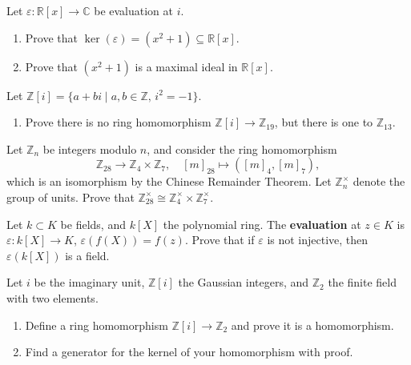 \documentclass[11pt,twoside,openany]{memoir}
\begin{document}
    \begin{exercise}
    Let $\varepsilon:\mathbb{R}[x]\to \mathbb{C}$ be evaluation at $i$.
    \begin{enumerate}[label=(\alph*)]
        \item Prove that $\ker(\varepsilon)=(x^2+1)\subseteq \mathbb{R}[x]$.
        \item Prove that $(x^2+1)$ is a maximal ideal in $\mathbb{R}[x]$.
    \end{enumerate}
    \end{exercise}
    
    \begin{exercise}
    Let $\mathbb{Z}[i]=\{a+bi \mid a,b\in \mathbb{Z},\, i^2=-1\}$.
    \begin{enumerate}[label=(\alph*)]
        \item Prove there is no ring homomorphism $\mathbb{Z}[i]\to \mathbb{Z}_{19}$, but there is one to $\mathbb{Z}_{13}$.
    \end{enumerate}
    \end{exercise}
    
    \begin{exercise}
    Let $\mathbb{Z}_n$ be integers modulo $n$, and consider the ring homomorphism
    \[
        \mathbb{Z}_{28} \to \mathbb{Z}_4 \times \mathbb{Z}_7, \quad [m]_{28} \mapsto ([m]_4,[m]_7),
    \]
    which is an isomorphism by the Chinese Remainder Theorem. Let $\mathbb{Z}_n^\times$ denote the group of units. Prove that $\mathbb{Z}_{28}^\times \cong \mathbb{Z}_4^\times \times \mathbb{Z}_7^\times$.
    \end{exercise}
    
    \begin{exercise}
    Let $k\subset K$ be fields, and $k[X]$ the polynomial ring. The \textbf{evaluation} at $z\in K$ is $\varepsilon:k[X]\to K$, $\varepsilon(f(X))=f(z)$. Prove that if $\varepsilon$ is not injective, then $\varepsilon(k[X])$ is a field.
    \end{exercise}
    
    \begin{exercise}
    Let $i$ be the imaginary unit, $\mathbb{Z}[i]$ the Gaussian integers, and $\mathbb{Z}_2$ the finite field with two elements.
    \begin{enumerate}[label=(\alph*)]
        \item Define a ring homomorphism $\mathbb{Z}[i]\to \mathbb{Z}_2$ and prove it is a homomorphism.
        \item Find a generator for the kernel of your homomorphism with proof.
    \end{enumerate}
    \end{exercise}
    
\end{document}
